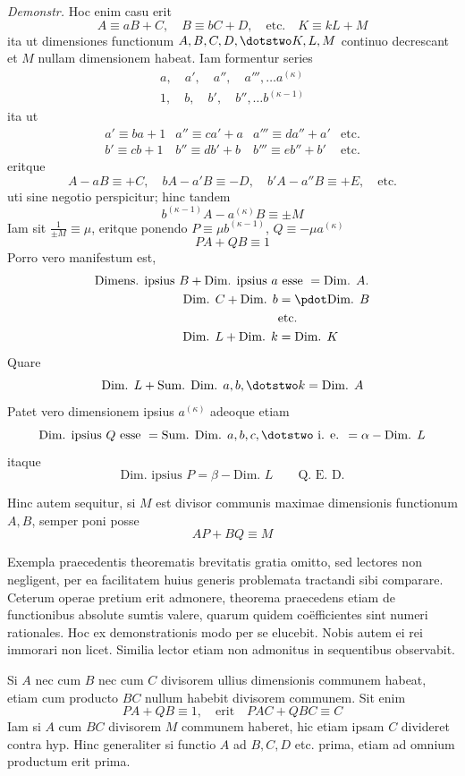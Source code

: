 \emph{Demonstr.} Hoc enim casu erit
\[
A\equiv aB+C,\quad B\equiv bC+D,\quad\text{etc.}\quad K\equiv kL+M
\]
ita ut dimensiones functionum $A,B,C,D,\dotstwo K,L,M$ continuo decrescant et $M$ nullam dimensionem habeat. Iam formentur series
\[
\begin{gathered}
a,\quad a',\quad a'',\quad a''',\ldots a^{(\kappa)}\\
1,\quad b,\quad b',\quad b'',\ldots b^{(\kappa-1)}
\end{gathered}
\]
ita ut
\[
\begin{array}{llll}
a'\equiv ba+1&a''\equiv ca'+a&a'''\equiv da''+a'&\text{etc.}\\
b'\equiv cb+1&b''\equiv db'+b&b'''\equiv eb''+b'&\text{etc.}
\end{array}
\]
eritque
\[
A-aB\equiv+C,\quad bA-a'B\equiv-D,\quad b'A-a''B\equiv+E,\quad\text{etc.}
\]
uti sine negotio perspicitur; hinc tandem
\[
b^{(\kappa-1)}A-a^{(\kappa)}B\equiv\pm M
\]
Iam sit $\frac1{\pm M}\equiv\mu$, eritque ponendo $P\equiv\mu b^{(\kappa-1)}$, $Q\equiv-\mu a^{(\kappa)}$
\[
PA+QB\equiv1
\]
Porro vero manifestum est,
\[
\begin{aligned}
\text{Dimens. ipsius }B+\text{Dim. ipsius }a&\text{ esse }=\text{Dim. }A.\\
\text{Dim. }C+\text{Dim. }b&=\pdot\text{Dim. }B\\
&\text{etc.}\\
\text{Dim. }L+\text{Dim. }k&=\text{Dim. }K
\end{aligned}
\]
Quare
\[
\text{Dim. }L+\text{Sum. Dim. }a,b,\dotstwo k=\text{Dim. }A
\]
Patet vero dimensionem ipsius $a^{(\kappa)}$ adeoque etiam
\[
\text{Dim. ipsius }Q\text{ esse }=\text{Sum. Dim. }a,b,c,\dotstwo\text{ i. e. }=\alpha-\text{Dim. }L
\]
itaque
\[
\text{Dim. ipsius }P=\beta-\text{Dim. }L\qquad\text{Q. E. D.}
\]

Hinc autem sequitur, si $M$ est divisor communis maximae dimensionis functionum $A,B$, semper poni posse
\[
AP+BQ\equiv M
\]

Exempla praecedentis theorematis brevitatis gratia omitto, sed lectores non negligent, per ea facilitatem huius generis problemata tractandi sibi comparare. Ceterum operae pretium erit admonere, theorema praecedens etiam de functionibus absolute sumtis valere, quarum quidem coëfficientes sint numeri rationales. Hoc ex demonstrationis modo per se elucebit. Nobis autem ei rei immorari non licet. Similia lector etiam non admonitus in sequentibus observabit.

Si $A$ nec cum $B$ nec cum $C$ divisorem ullius dimensionis communem habeat, etiam cum producto $BC$ nullum habebit divisorem communem. Sit enim
\[
PA+QB\equiv1,\quad\text{erit}\quad PAC+QBC\equiv C
\]
Iam si $A$ cum $BC$ divisorem $M$ communem haberet, hic etiam ipsam $C$ divideret contra hyp. Hinc generaliter si functio $A$ ad $B,C,D$ etc. prima, etiam ad omnium productum erit prima.

